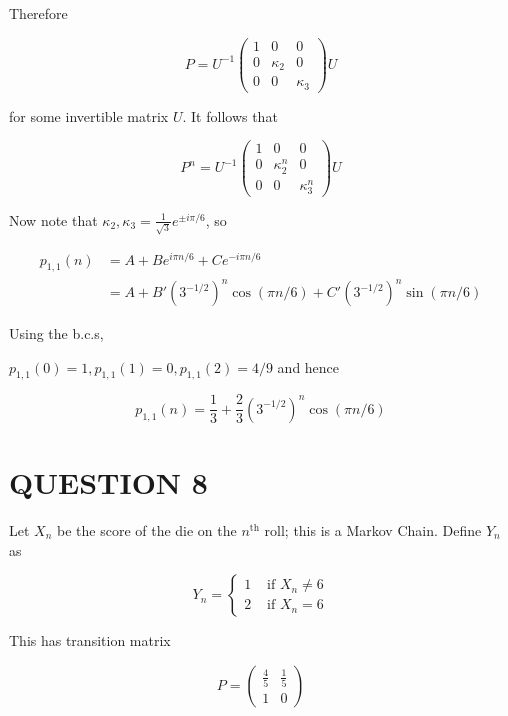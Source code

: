 \documentclass[a4paper]{article}
\begin{document}
\begin{enumerate}
Therefore

\[ P = U^{-1} \begin{pmatrix}
1 & 0 & 0 \\
0 & \kappa_{2} & 0 \\
0 & 0 & \kappa_{3}
\end{pmatrix} U \]

for some invertible matrix $ U $. It follows that

\[ P^{n} = U^{-1} \begin{pmatrix}
1 & 0 & 0 \\
0 & \kappa_{2}^{n} & 0 \\
0 & 0 & \kappa_{3}^{n}
\end{pmatrix} U  \]

Now note that $ \kappa_{2},\kappa_{3} = \frac{1}{\sqrt{3}} e^{\pm i \pi / 6}  $, so 

\begin{align*}
 p_{1,1}(n) & = A + B e^{i \pi n / 6} + C e^{- i \pi n / 6}  \\
& = A + B' \left(  3^{-1/2} \right)^{n}  \cos( \pi n / 6) + C' \left(  3^{-1/2} \right)^{n} \sin ( \pi n / 6)
\end{align*}

Using the b.c.s,

$ p_{1,1}(0) = 1, p_{1,1}(1) = 0, p_{1,1}(2) = 4/9 $ and hence

\[ p_{1,1}(n) = \frac{1}{3} + \frac{2}{3} \left(  3^{-1/2} \right)^{n} \cos (\pi n / 6)  \]





\end{enumerate}





\section{QUESTION 8}

Let $ X_{n} $ be the score of the die on the $ n^{\text{th}} $ roll; this is a Markov Chain. Define $ Y_{n} $ as

\[ Y_{n} = \begin{cases} 1  & \text{ if } X_{n} \neq 6 \\ 2 & \text{ if } X_{n} = 6 \end{cases} \]

This has transition matrix

\[ P = \begin{pmatrix}
\frac{4}{5} & \frac{1}{5} \\
1 & 0
\end{pmatrix} \]
\end{document}
